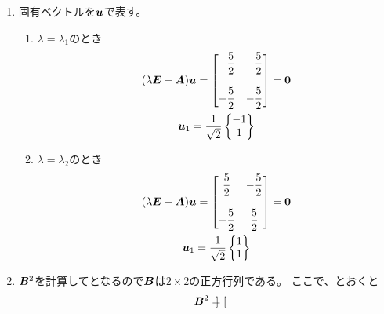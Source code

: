 \begin{ans*}
  ${}$
  \begin{enumerate}[label=(\arabic*)]
    \item 固有ベクトルを${\bm{u}}$で表す。
    
    \begin{enumerate}[label=(\roman*)]
      \item $\lambda = \lambda_1$のとき
      \begin{gather}
        (\lambda \bm{E} - \bm{A}){\bm{u}}
        =
        \begin{bmatrix}
          {\displaystyle-\frac{5}{2}} & {\displaystyle -\frac{5}{2}} \\
          \\
          {\displaystyle -\frac{5}{2}} & {\displaystyle -\frac{5}{2}} \\
        \end{bmatrix}
        = \bm{0} \\
        {\bm{u}}_1 = 
        \frac{1}{\sqrt{2}}
        \begin{Bmatrix}
          -1 \\ 1
        \end{Bmatrix}
      \end{gather}
      \item $\lambda = \lambda_2$のとき
      \begin{gather}
        (\lambda \bm{E} - \bm{A}){\bm{u}}
        =
        \begin{bmatrix}
          {\displaystyle\frac{5}{2}} & {\displaystyle -\frac{5}{2}} \\
          \\
          {\displaystyle -\frac{5}{2}} & {\displaystyle \frac{5}{2}} \\
        \end{bmatrix}
        = \bm{0} \\
        {\bm{u}}_1 = 
        \frac{1}{\sqrt{2}}
        \begin{Bmatrix}
          1 \\ 1
        \end{Bmatrix}
      \end{gather}
    \end{enumerate}
    \item $\bm{B}^2$を計算して\bA となるので$\bm{B}$は$2\times2$の正方行列である。
    ここで、とおくと
    \begin{gather}
      \bm{B}^2 =
      \begin{bmatrix}

\end{bmatrix}
\end{gather}
\end{enumerate}
\end{ans*}
